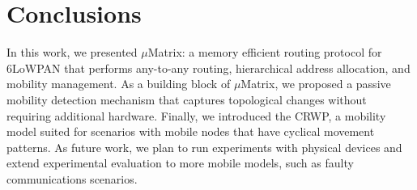 \section{Conclusions}
\label{sec:conclusions}

In this work, we presented $\mu$Matrix: a memory efficient routing protocol for 6LoWPAN that performs any-to-any routing, hierarchical address allocation, and mobility management. As a building block of $\mu$Matrix, we proposed a passive mobility detection mechanism that captures topological changes without requiring additional hardware. Finally, we introduced the CRWP, a mobility model suited for scenarios with mobile nodes that have cyclical movement patterns. As future work, we plan to run experiments with physical devices and extend experimental evaluation to more mobile models, such as faulty communications scenarios. 